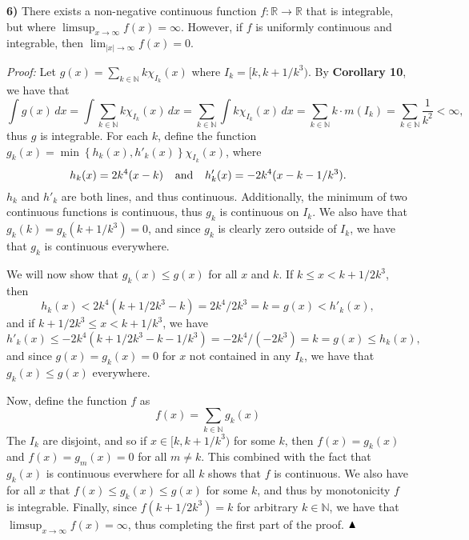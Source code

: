 \documentclass[12pt]{article}
\newcommand{\N}{\ensuremath{\mathbb{N}}}
\newcommand{\R}{\ensuremath{\mathbb{R}}}
\newcommand{\braceb}[1]{\left\{#1\right\}}
\newcommand{\vertb}[1]{\left\vert#1\right\vert}
\newcommand{\proof}{\textit{Proof: }}
\newcommand{\partialdone}{\ensuremath{\strut\hfill\blacktriangle}}
\renewcommand{\t}[1]{\text{ #1 }}
\begin{document}
\pagestyle{fancy}

\setlength{\parindent}{0in}
\setlength{\parskip}{0.1in}

\textbf{6)}
There exists a non-negative continuous function \( f : \R \to \R \) that is
integrable, but where \( \limsup_{x \to \infty} f(x) = \infty \).
However, if \( f \) is uniformly continuous and integrable, then
\( \lim_{\vertb{x} \to \infty} f(x) = 0 \).

\proof
Let \( g(x) = \sum_{k \in \N} k \chi_{I_k}(x) \) where
\( I_k = [k, k + 1/k^3) \).
By \textbf{Corollary 10}, we have that
\[
	\int g(x) \, dx
	= \int \sum_{k \in \N} k\chi_{I_k}(x) \, dx
	= \sum_{k \in \N} \int k\chi_{I_k}(x) \, dx
	= \sum_{k \in \N} k \cdot m(I_k)
	= \sum_{k \in \N} \frac{1}{k^2}
	< \infty,
\]
thus \( g \) is integrable.
For each \( k \), define the function
\( g_k(x) = \min\braceb{h_k(x), h'_k(x)} \chi_{I_k}(x) \), where
\[
	h_k(x) = 2k^4(x - k)
	\hspace{0.1in}
	\t{and}
	\hspace{0.1in}
	h'_k(x) = -2k^4(x - k - 1/k^3).
\]
\( h_k \) and \( h'_k \) are both lines, and thus continuous.
Additionally, the minimum of two continuous functions is continuous, thus
\( g_k \) is continuous on \( I_k \).
We also have that \( g_k(k) = g_k(k + 1/k^3) = 0 \), and since \( g_k \) is
clearly zero outside of \( I_k \), we have that \( g_k \) is continuous
everywhere.

We will now show that \( g_k(x) \leq g(x) \) for all \( x \) and \( k \).
If \( k \leq x < k + 1/2k^3 \), then
\[
	h_k(x) < 2k^4(k + 1/2k^3 - k) = 2k^4/2k^3 = k = g(x) < h'_k(x),
\]
and if \( k + 1/2k^3 \leq x < k + 1/k^3 \), we have
\[
	h'_k(x) \leq -2k^4(k + 1/2k^3 - k - 1/k^3) = -2k^4/(-2k^3) = k = g(x)
	\leq h_k(x),
\]
and since \( g(x) = g_k(x) = 0 \) for \( x \) not contained in any \( I_k \),
we have that \( g_k(x) \leq g(x) \) everywhere.

Now, define the function \( f \) as
\[
	f(x) = \sum_{k \in \N} g_k(x)
\]
The \( I_k \) are disjoint, and so if \( x \in [k, k + 1/k^3) \) for some
\( k \), then \( f(x) = g_k(x) \) and \( f(x) = g_m(x) = 0 \) for all
\( m \ne k \).
This combined with the fact that \( g_k(x) \) is continuous everwhere for
all \( k \) shows that \( f \) is continuous.
We also have for all \( x \) that \( f(x) \leq g_k(x) \leq g(x) \) for some
\( k \), and thus by monotonicity \( f \) is integrable.
Finally, since \( f(k + 1/2k^3) = k \) for arbitrary \( k \in \N \), we have
that \( \limsup_{x \to \infty} f(x) = \infty \), thus completing the first part
of the proof.
\partialdone
\end{document}
